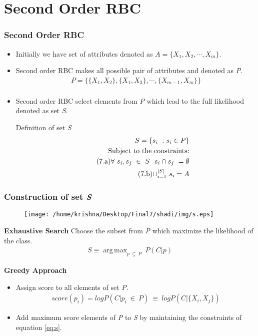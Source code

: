 \documentclass[10pt, blue,subsection=true, compress]{beamer}
\DeclareMathOperator*{\argmax}{arg\,max}
\begin{document}

\section{Second Order RBC}
\begin{frame}\frametitle{Second Order RBC}
\begin{itemize}
\item  Initially we have set of attributes denoted as $A = \{ X_1, X_2, \cdots, X_m\}$. 
\item Second order RBC makes all possible pair of attributes and denoted as \textit{P}.
\begin{align*}
 P = \{ \{ X_1, X_2\}, \{ X_1, X_3\}, \cdots, \{ X_{m-1}, X_m\}\} \\
\end{align*}
\item Second order RBC select elements from \textit{P} which lead to the full likelihood denoted as set \textit{S}. 
\begin{block}{Definition of set \textit{S}}
\begin{align}
\label{eq:s}
    S = \{ s_i ~: s_i \in P  \}\\
   \text{Subject to the constraints:} \notag \\
   \nonumber \tag{7.a} \forall~ s_i, s_j ~ \in ~S ~~ s_i \cap s_j ~ = \emptyset \\
   \nonumber \tag{7.b} \displaystyle{\cup_{i=1}^{|S|}} ~ s_i = A 
\end{align}
\end{block}
\end{itemize}
\end{frame}

\begin{frame}\frametitle{Construction of set \textit{S}}
\begin{figure}[htbp]
\centering
\texttt{[image: /home/krishna/Desktop/Final7/shadi/img/s.eps]}
\end{figure}
\begin{block}{\textbf{Exhaustive Search}}
Choose the subset from \textit{P} which maximize the likelihood of the class.
\begin{align}
S \equiv \argmax_{p ~ \subsetneq ~ P} ~  P(C | p)
\end{align}
\end{block}

\begin{block}{\textbf{Greedy Approach}}
\begin{itemize}
\item Assign score to all elements of set \textit{P}.
\begin{align}
 score(p_i) = log P( C | p_i ~\in~ P) ~\equiv ~ log P( C | \{X_i,X_j\}) 
\end{align}
\item Add maximum score elements of \textit{P} to \textit{S} by maintaining the constraints of equation \eqref{eq:s}.
\end{itemize}
\end{block}
\end{frame}
\end{document}
